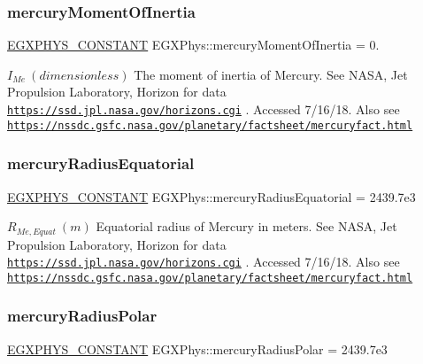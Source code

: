 \subsubsection{\texorpdfstring{mercury\+Moment\+Of\+Inertia}{mercuryMomentOfInertia}}
{\footnotesize\ttfamily \mbox{\hyperlink{group___e_g_x_phys-_constants-_macros_ga76980d288494ce1714c9ac68a95ba702}{E\+G\+X\+P\+H\+Y\+S\+\_\+\+C\+O\+N\+S\+T\+A\+NT}} E\+G\+X\+Phys\+::mercury\+Moment\+Of\+Inertia = 0.}

$ I_{Me} \ (dimensionless)$ The moment of inertia of Mercury. See N\+A\+SA, Jet Propulsion Laboratory, Horizon for data \href{https://ssd.jpl.nasa.gov/horizons.cgi}{\tt https\+://ssd.\+jpl.\+nasa.\+gov/horizons.\+cgi} . Accessed 7/16/18. Also see \href{https://nssdc.gsfc.nasa.gov/planetary/factsheet/mercuryfact.html}{\tt https\+://nssdc.\+gsfc.\+nasa.\+gov/planetary/factsheet/mercuryfact.\+html} \mbox{\label{group___e_g_x_phys-_constants-_astrophysics-_solar_system-_mercury-_bulk_ga393f8b6ff7abcaec833aed015879dc98}} 
\subsubsection{\texorpdfstring{mercury\+Radius\+Equatorial}{mercuryRadiusEquatorial}}
{\footnotesize\ttfamily \mbox{\hyperlink{group___e_g_x_phys-_constants-_macros_ga76980d288494ce1714c9ac68a95ba702}{E\+G\+X\+P\+H\+Y\+S\+\_\+\+C\+O\+N\+S\+T\+A\+NT}} E\+G\+X\+Phys\+::mercury\+Radius\+Equatorial = 2439.\+7e3}

$R_{Me,Equat} \ (m)$ Equatorial radius of Mercury in meters. See N\+A\+SA, Jet Propulsion Laboratory, Horizon for data \href{https://ssd.jpl.nasa.gov/horizons.cgi}{\tt https\+://ssd.\+jpl.\+nasa.\+gov/horizons.\+cgi} . Accessed 7/16/18. Also see \href{https://nssdc.gsfc.nasa.gov/planetary/factsheet/mercuryfact.html}{\tt https\+://nssdc.\+gsfc.\+nasa.\+gov/planetary/factsheet/mercuryfact.\+html} \mbox{\label{group___e_g_x_phys-_constants-_astrophysics-_solar_system-_mercury-_bulk_ga09f4dddb4a5d0f0e539d5fcddfb5b45c}} 
\subsubsection{\texorpdfstring{mercury\+Radius\+Polar}{mercuryRadiusPolar}}
{\footnotesize\ttfamily \mbox{\hyperlink{group___e_g_x_phys-_constants-_macros_ga76980d288494ce1714c9ac68a95ba702}{E\+G\+X\+P\+H\+Y\+S\+\_\+\+C\+O\+N\+S\+T\+A\+NT}} E\+G\+X\+Phys\+::mercury\+Radius\+Polar = 2439.\+7e3}

